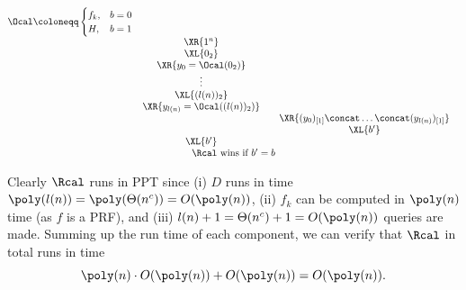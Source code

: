 \begin{answer}[c]
{\[\begin{array}{@{} c c c c c@{}}
            \Ocal \coloneqq \begin{cases}
                f_{k}, &b=0\\
                H, &b=1
            \end{cases} & & & & \\
            & \XR{1^n} & &  & \\
            & \XL{0_2} & &  & \\
            & \XR{y_0= \Ocal(0_2)} & & & \\
            & \vdots & &  & \\
            & \XL{(l(n))_2} & &  & \\
            & \XR{y_{l(n)}= \Ocal((l(n))_2)} & & & \\
            & & & \XR{(y_0)_{[1]}\concat\ldots\concat(y_{l(n)})_{[1]}} & \\
            & & & \XL{b'} & \\
            & \XL{b'} & & & \\
            \multicolumn{5}{c}{\text{$\Rcal$ wins if $b' = b$}}
            \end{array}
        \]
        \label{fig:p3-game6}
    }

    Clearly $\Rcal$ runs in PPT since (i) $D$ runs in time $\poly(l(n))=\poly(\Theta(n^c))=O(\poly(n))$, (ii) $f_k$ can be computed in $\poly(n)$ time (as $f$ is a PRF), and (iii) $l(n)+1=\Theta(n^c)+1=O(\poly(n))$ queries are made. Summing up the run time of each component, we can verify that $\Rcal$ in total runs in time
    \[
        \poly(n)\cdot O(\poly(n))+ O(\poly(n)) = O(\poly(n)).
    \]
    

\end{answer}
